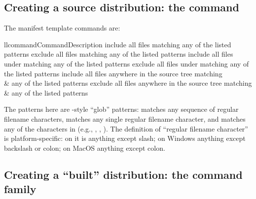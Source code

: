 \documentclass{howto}
\begin{document}
\subsection{Creating a source distribution: the
            \protect{} command}
\label{sdist-cmd}



The manifest template commands are:
\begin{tableii}{ll}{command}{Command}{Description}
    {include all files matching any of the listed patterns}
    {exclude all files matching any of the listed patterns}
    {include all files under  matching any of the listed patterns}
    {exclude all files under  matching any of the listed patterns}
    {include all files anywhere in the source tree matching\\&
     any of the listed patterns}
    {exclude all files anywhere in the source tree matching\\&
     any of the listed patterns}
\end{tableii}
The patterns here are \UNIX-style ``glob'' patterns: \code{*} matches any
sequence of regular filename characters,  matches any single
regular filename character, and  matches any of the
characters in  (e.g., , ,
).  The definition of ``regular filename character'' is
platform-specific: on \UNIX{} it is anything except slash; on Windows
anything except backslash or colon; on MacOS anything except colon.



\subsection{Creating a ``built'' distribution: the
  \protect{} command family}
\label{bdist-cmds}


\subsubsection{\protect{}}

\subsubsection{\protect{}}

\subsubsection{\protect{}}

\subsubsection{\protect{}}
\end{document}
